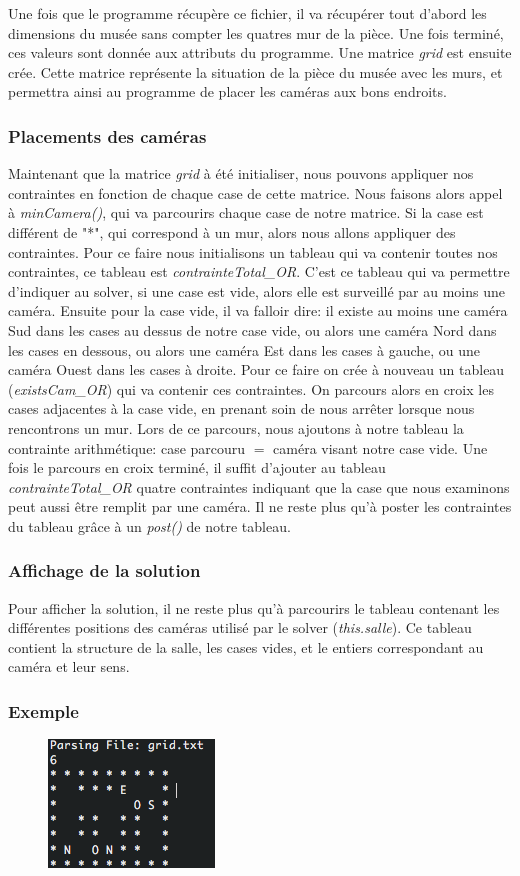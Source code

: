\documentclass[a4paper,10pt]{article}
\begin{document}
			Une fois que le programme récupère ce fichier, il va récupérer tout d'abord les dimensions du musée sans compter les quatres mur de la pièce.  Une fois terminé, ces valeurs sont donnée aux attributs du programme. Une matrice \emph{grid} est ensuite crée.  Cette matrice représente la situation de la pièce du musée avec les murs, et permettra ainsi au programme de placer les caméras aux bons endroits.

		\subsubsection{Placements des caméras}
			Maintenant que la matrice \emph{grid} à été initialiser, nous pouvons appliquer nos contraintes en fonction de chaque case de cette matrice. Nous faisons alors appel à \emph{minCamera()}, qui va parcourirs chaque case de notre matrice.  Si la case est différent de "*", qui correspond à un mur, alors nous allons appliquer des contraintes. Pour ce faire nous initialisons un tableau qui va contenir toutes nos contraintes, ce tableau est \emph{contrainteTotal\_OR}. C'est ce tableau qui va permettre d'indiquer au solver, si une case est vide, alors elle est surveillé par au moins une caméra. Ensuite pour la case vide, il va falloir dire: il existe au moins une caméra Sud dans les cases au dessus de notre case vide, ou alors une caméra Nord dans les cases en dessous, ou alors une caméra Est dans les cases à gauche, ou une caméra Ouest dans les cases à droite.  Pour ce faire on crée à nouveau un tableau (\emph{existsCam\_OR}) qui va contenir ces contraintes. On parcours alors en croix les cases adjacentes à la case vide, en prenant soin de nous arrêter lorsque nous rencontrons un mur. Lors de ce parcours, nous ajoutons à notre tableau la contrainte arithmétique: case parcouru $=$ caméra visant notre case vide. Une fois le parcours en croix terminé, il suffit d'ajouter au tableau \emph{contrainteTotal\_OR} quatre contraintes indiquant que la case que nous examinons peut aussi être remplit par une caméra. Il ne reste plus qu'à poster les contraintes du tableau grâce à un \emph{post()} de notre tableau.

		\subsubsection{Affichage de la solution}
			Pour afficher la solution, il ne reste plus qu'à parcourirs le tableau contenant les différentes positions des caméras utilisé par le solver (\emph{this.salle}).  Ce tableau contient la structure de la salle, les cases vides, et le entiers correspondant au caméra et leur sens.

		\subsubsection{Exemple}
			\begin{figure}[h]
			\begin{center}
				\includegraphics[scale=0.7]{img/sol.png}
			\end{center}
			\end{figure}
\end{document}
